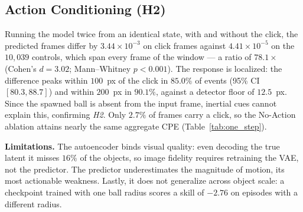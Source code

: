 \documentclass[conference]{IEEEtran}
\begin{document}
\subsection{Action Conditioning (H2)}

Running the model twice from an identical state, with and without the click, the predicted frames differ by $3.44 \times 10^{-3}$ on click frames against $4.41 \times 10^{-5}$ on the $10{,}039$ controls, which span every frame of the window --- a ratio of $78.1\times$ (Cohen's $d = 3.02$; Mann--Whitney $p < 0.001$). The response is localized: the difference peaks within $100$~px of the click in $85.0\%$ of events (95\% CI $[80.3, 88.7]$) and within $200$~px in $90.1\%$, against a detector floor of $12.5$~px. Since the spawned ball is absent from the input frame, inertial cues cannot explain this, confirming \textit{H2}. Only $2.7\%$ of frames carry a click, so the No-Action ablation attains nearly the same aggregate CPE (Table~\ref{tab:one_step}).

\textbf{Limitations.} The autoencoder binds visual quality: even decoding the true latent it misses $16\%$ of the objects, so image fidelity requires retraining the VAE, not the predictor. The predictor underestimates the magnitude of motion, its most actionable weakness. Lastly, it does not generalize across object scale: a checkpoint trained with one ball radius scores a skill of $-2.76$ on episodes with a different radius.




\end{document}
